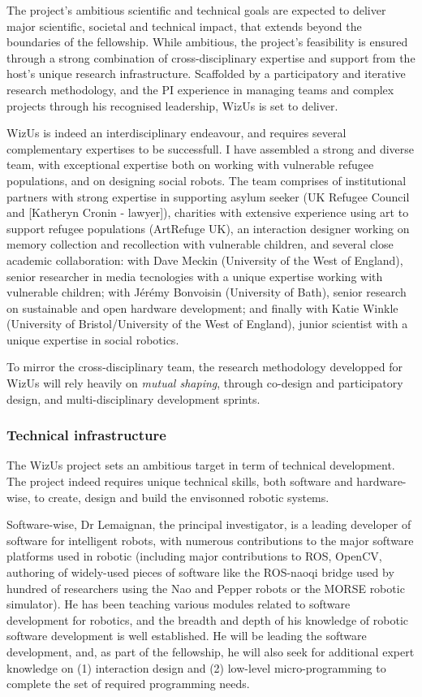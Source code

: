 \documentclass[]{article}
\newcommand{\project}{WizUs\xspace}
\begin{document}
The project's ambitious scientific and technical goals are expected to deliver
major scientific, societal and technical impact, that extends beyond the
boundaries of the fellowship. While ambitious, the project's feasibility is
ensured through a strong combination of cross-disciplinary expertise and
support from the host's unique research infrastructure. Scaffolded by a
participatory and iterative research methodology, and the PI experience in
managing teams and complex projects through his recognised leadership, \project
is set to deliver.

\project is indeed an interdisciplinary endeavour, and requires several
complementary expertises to be successfull. I have assembled a strong and
diverse team, with exceptional expertise both on working with vulnerable refugee
populations, and on designing social robots. The team comprises of institutional
partners with strong expertise in supporting asylum seeker (UK Refugee Council
and [Katheryn Cronin - lawyer]), charities with extensive experience using art
to support refugee populations (ArtRefuge UK), an interaction designer working
on memory collection and recollection with vulnerable children, and several
close academic collaboration: with Dave Meckin (University of the West of
England), senior researcher in media tecnologies with a unique expertise working
with vulnerable children; with Jérémy Bonvoisin (University of Bath), senior
research on sustainable and open hardware development; and finally with Katie
Winkle (University of Bristol/University of the West of England), junior
scientist with a unique expertise in social robotics.

To mirror the cross-disciplinary team, the research methodology developped for
\project will rely heavily on \emph{mutual shaping}, through co-design and
participatory design, and multi-disciplinary development sprints.

\subsubsection{Technical infrastructure}

The \project project sets an ambitious target in term of technical development.
The project indeed requires unique technical skills, both software and
hardware-wise, to create, design and build the envisonned robotic systems.

Software-wise, Dr Lemaignan, the principal investigator, is a leading
developer of software for intelligent robots, with numerous contributions to
the major software platforms used in robotic (including major contributions to
ROS, OpenCV, authoring of widely-used pieces of software like the ROS-naoqi
bridge used by hundred of researchers using the Nao and Pepper robots or the
MORSE robotic simulator). He has been teaching various modules related to
software development for robotics, and the breadth and depth of his knowledge of
robotic software development is well established. He will be leading the
software development, and, as part of the fellowship, he will also seek for
additional expert knowledge on (1) interaction design and (2) low-level
micro-programming to complete the set of required programming needs.
\end{document}

